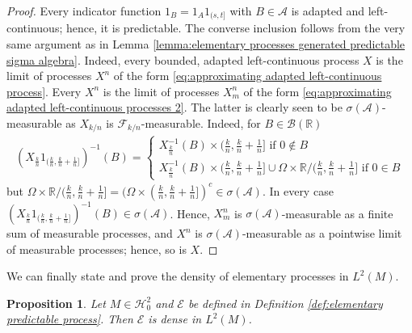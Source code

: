 \documentclass[11pt,a4paper,twoside,openany]{report}
\numberwithin{equation}{section}
\theoremstyle{plain} %
\newtheorem{proposition}[theorem]{Proposition}
\theoremstyle{definition} %
\theoremstyle{remark} %
\begin{document}
\begin{proof}
    Every indicator function \(1_B=1_A1_{(s,t]}\) with \(B\in\mathcal{A}\) is adapted and left-continuous; hence, it is predictable. The converse inclusion follows from the very same argument as in Lemma \ref{lemma:elementary processes generated predictable sigma algebra}. Indeed, every bounded, adapted left-continuous process \(X\) is the limit of processes \(X^n\) of the form \eqref{eq:approximating adapted left-continuous process}. Every \(X^n\) is the limit of processes \(X^n_m\) of the form \eqref{eq:approximating adapted left-continuous processes 2}. The latter is clearly seen to be \(\sigma(\mathcal{A})\)-measurable as \(X_{k/n}\) is \(\mathcal{F}_{k/n}\)-measurable. Indeed, for \(B\in\mathcal{B}(\mathbb{R})\)
    \begin{align*}
    (X_{\frac{k}{n}}1_{(\frac{k}{n},\frac{k}{n}+\frac{1}{n}]})^{-1}(B)=
    \begin{cases}
        X_{\frac{k}{n}}^{-1}(B)\times (\frac{k}{n},\frac{k}{n}+\frac{1}{n}] \text{ if }0\notin B\\
        X_{\frac{k}{n}}^{-1}(B)\times (\frac{k}{n},\frac{k}{n}+\frac{1}{n}]\cup \Omega\times \mathbb{R}/(\frac{k}{n},\frac{k}{n}+\frac{1}{n}]\text{ if }0\in B
    \end{cases}
    \end{align*}
    but \( \Omega\times \mathbb{R}/(\frac{k}{n},\frac{k}{n}+\frac{1}{n}]=(\Omega\times(\frac{k}{n},\frac{k}{n}+\frac{1}{n}])^c\in\sigma(\mathcal{A})\). In every case
    \((X_{\frac{k}{n}}1_{(\frac{k}{n},\frac{k}{n}+\frac{1}{n}]})^{-1}(B)\in\sigma(\mathcal{A})\).
    Hence, \(X^n_m\) is \(\sigma(\mathcal{A})\)-measurable as a finite sum of measurable processes, and \(X^n\) is \(\sigma(\mathcal{A})\)-measurable as a pointwise limit of measurable processes; hence, so is \(X\).
\end{proof}
We can finally state and prove the density of elementary processes in \(L^2(M)\).
\begin{proposition}\label{prop:density of E in L2(M) via monotone class}
    Let \(M\in\mathcal{H}^2_0\) and \(\mathcal{E}\) be defined in Definition \ref{def:elementary predictable process}. Then \(\mathcal{E}\) is dense in \(L^2(M)\).
\end{proposition}
\end{document}
